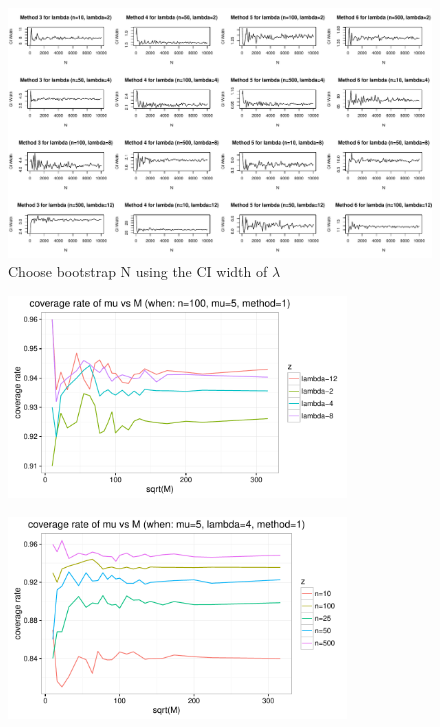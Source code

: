 \documentclass[12pt]{article}
\begin{document}
\begin{figure}[h] 
\includegraphics[width=1.0\textwidth]{findN_la.pdf}
\caption{Choose bootstrap N using the CI width of $\lambda$}
\end{figure}


\begin{figure}[h] 
\includegraphics[width=0.8\textwidth]{findM1.pdf}
\caption{}
\end{figure}

\begin{figure}[h] 
\includegraphics[width=0.8\textwidth]{findM2.pdf}
\caption{}
\end{figure}
\end{document}
